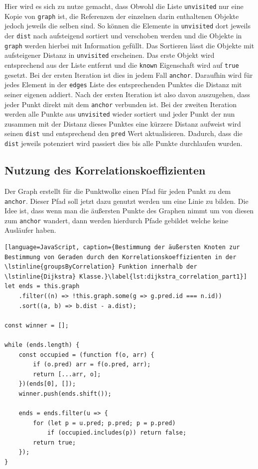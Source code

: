 Hier wird es sich zu nutze gemacht, dass Obwohl die Liste \lstinline{unvisited} nur eine Kopie von \lstinline{graph} ist, die Referenzen der einzelnen darin enthaltenen Objekte jedoch jeweils die selben sind.
So können die Elemente in \lstinline{unvisited} dort jeweils der \lstinline{dist} nach aufsteigend sortiert und verschoben werden und die Objekte in \lstinline{graph} werden hierbei mit Information gefüllt.
Das Sortieren lässt die Objekte mit aufsteigener Distanz in \lstinline{unvisited} erscheinen.
Das erste Objekt wird entsprechend aus der Liste entfernt und die \lstinline{known} Eigenschaft wird auf \lstinline{true} gesetzt.
Bei der ersten Iteration ist dies in jedem Fall \lstinline{anchor}.
Daraufhin wird für jedes Element in der \lstinline{edges} Liste des entsprechenden Punktes die Distanz mit seiner eigenen addiert.
Nach der ersten Iteration ist also davon auszugehen, dass jeder Punkt direkt mit dem \lstinline{anchor} verbunden ist.
Bei der zweiten Iteration werden alle Punkte aus \lstinline{unvisited} wieder sortiert und jeder Punkt der nun zusammen mit der Distanz dieses Punktes eine kürzere Distanz aufweist wird seinen \lstinline{dist} und entsprechend den \lstinline{pred} Wert aktualisieren.
Dadurch, dass die \lstinline{dist} jeweils potenziert wird passiert dies bis alle Punkte durchlaufen wurden.

\subsection{Nutzung des Korrelationskoeffizienten}

Der Graph erstellt für die Punktwolke einen Pfad für jeden Punkt zu dem \lstinline{anchor}.
Dieser Pfad soll jetzt dazu genutzt werden um eine Linie zu bilden.
Die Idee ist, dass wenn man die äußersten Punkte des Graphen nimmt um von diesen zum \lstinline{anchor} wandert, dann werden hierdurch Pfade gebildet welche keine Ausläufer haben.

\begin{lstlisting}[language=JavaScript, caption={Bestimmung der äußersten Knoten zur Bestimmung von Geraden durch den Korrelationskoeffizienten in der \lstinline{groupsByCorrelation} Funktion innerhalb der \lstinline{Dijkstra} Klasse.}\label{lst:dijkstra_correlation_part1}]
let ends = this.graph
    .filter((n) => !this.graph.some(g => g.pred.id === n.id))
    .sort((a, b) => b.dist - a.dist);

const winner = [];

while (ends.length) {
    const occupied = (function f(o, arr) {
        if (o.pred) arr = f(o.pred, arr);
        return [...arr, o];
    })(ends[0], []);
    winner.push(ends.shift());

    ends = ends.filter(u => {
        for (let p = u.pred; p.pred; p = p.pred)
            if (occupied.includes(p)) return false;
        return true;
    });
}
\end{lstlisting}

